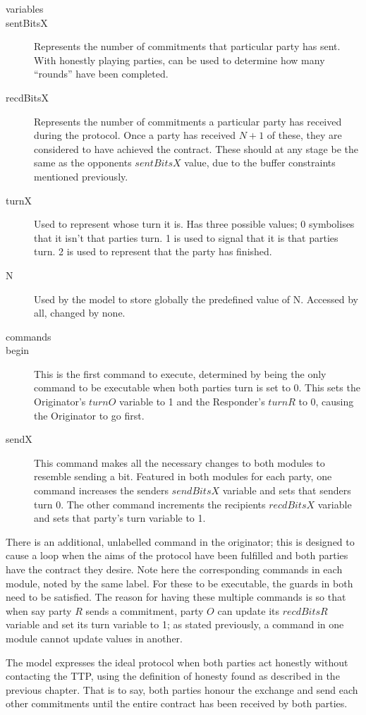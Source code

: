 \documentclass{l4proj}
\begin{document}
\begin{description}
\item[variables]
\item[sentBitsX] Represents the number of commitments that particular party has sent. With honestly playing parties, can be used to determine how many ``rounds'' have been completed.
\item[recdBitsX] Represents the number of commitments a particular party has received during the protocol. Once a party has received $N+1$ of these, they are considered to have achieved the contract. These should at any stage be the same as the opponents $sentBitsX$ value, due to the buffer constraints mentioned previously.
\item[turnX] Used to represent whose turn it is. Has three possible values; 0 symbolises that it isn't that parties turn. 1 is used to signal that it is that parties turn. 2 is used to represent that the party has finished.
\item[N] Used by the model to store globally the predefined value of N. Accessed by all, changed by none.
\item[commands]
\item[begin] This is the first command to execute, determined by being the only command to be executable when both parties turn is set to 0. This sets the Originator's $turnO$ variable to 1 and the Responder's $turnR$ to 0, causing the Originator to go first. 
\item[sendX] This command makes all the necessary changes to both modules to resemble sending a bit. Featured in both modules for each party, one command increases the senders $sendBitsX$ variable and sets that senders turn 0. The other command increments the recipients $recdBitsX$ variable and sets that party's turn variable to 1.
\end{description}

There is an additional, unlabelled command in the originator; this is designed to cause a loop when the aims of the protocol have been fulfilled and both parties have the contract they desire. Note here the corresponding commands in each module, noted by the same label. For these to be executable, the guards in both need to be satisfied. The reason for having these multiple commands is so that when say party $R$ sends a commitment, party $O$ can update its $recdBitsR$ variable and set its turn variable to 1; as stated previously, a command in one module cannot update values in another.

The model expresses the ideal protocol when both parties act honestly without contacting the TTP, using the definition of honesty found as described in the previous chapter. That is to say, both parties honour the exchange and send each other commitments until the entire contract has been received by both parties. 
\end{document}
